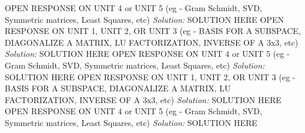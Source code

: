 \ifnum {} %
    OPEN RESPONSE ON UNIT 4 or UNIT 5 (eg - Gram Schmidt, SVD, Symmetric matrices, Least Squares, etc)
    \ifnum {} {\color{DarkBlue} \textit{Solution:} SOLUTION HERE  } \fi    
\fi 
\ifnum {} %
    OPEN RESPONSE ON UNIT 1, UNIT 2, OR UNIT 3 (eg - BASIS FOR A SUBSPACE, DIAGONALIZE A MATRIX, LU FACTORIZATION, INVERSE OF A 3x3, etc)
    \ifnum {} {\color{DarkBlue} \textit{Solution:} SOLUTION HERE  } \fi    
\fi 
\ifnum {} %
    OPEN RESPONSE ON UNIT 4 or UNIT 5 (eg - Gram Schmidt, SVD, Symmetric matrices, Least Squares, etc)
    \ifnum {} {\color{DarkBlue} \textit{Solution:} SOLUTION HERE  } \fi    
\fi 
\ifnum {} %
    OPEN RESPONSE ON UNIT 1, UNIT 2, OR UNIT 3 (eg - BASIS FOR A SUBSPACE, DIAGONALIZE A MATRIX, LU FACTORIZATION, INVERSE OF A 3x3, etc)
    \ifnum {} {\color{DarkBlue} \textit{Solution:} SOLUTION HERE  } \fi    
\fi 
\ifnum {} %
    OPEN RESPONSE ON UNIT 4 or UNIT 5 (eg - Gram Schmidt, SVD, Symmetric matrices, Least Squares, etc)
    \ifnum {} {\color{DarkBlue} \textit{Solution:} SOLUTION HERE  } \fi    
\fi 
